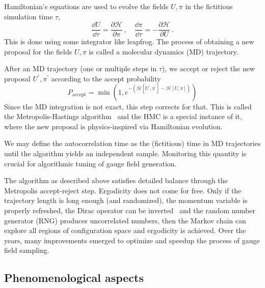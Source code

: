 Hamiltonian's equations are used to evolve the fields $U, \pi$ in the fictitious simulation time $\tau$,
\begin{equation}
\frac{\dd U}{\dd \tau} = \frac{\partial \mathcal{H}}{\partial \pi} \,,
\quad
\frac{\dd \pi}{\dd \tau} = -\frac{\partial \mathcal{H}}{\partial U} \,.
\end{equation}
This is done using some integrator like leapfrog.
The process of obtaining a new proposal for the fields $U, \pi$ is called a molecular dynamics (MD) trajectory.

After an MD trajectory (one or multiple steps in $\tau$), we accept or reject the new proposal $U^{\prime}, \pi^{\prime}$ according to the accept probability
\begin{equation}
P_{\text{accept}} = \min \left( 1, e^{-(\mathcal{H}[U^{\prime}, \pi^{\prime}] - \mathcal{H}[U, \pi])} \right)
\end{equation}
Since the MD integration is not exact, this step corrects for that.
This is called the Metropolis-Hastings algorithm~\cite{10.1063/1.1699114,10.1093/biomet/57.1.97} and the HMC is a special instance of it, where the new proposal is physics-inspired via Hamiltonian evolution.

We may define the autocorrelation time as the (fictitious) time in MD trajectories until the algorithm yields an independent sample.
Monitoring this quantity is crucial for algorithmic tuning of gauge field generation.

The algorithm as described above satisfies detailed balance through the Metropolis accept-reject step.
Ergodicity does not come for free.
Only if the trajectory length is long enough (and randomized), the momentum variable is properly refreshed, the Dirac operator can be inverted~\cite{Gupta:1990ka} and the random number generator (RNG) produces uncorrelated numbers, then the Markov chain can explore all regions of configuration space and ergodicity is achieved.
Over the years, many improvements emerged to optimize and speedup the process of gauge field sampling.

\subsection{Phenomenological aspects}

